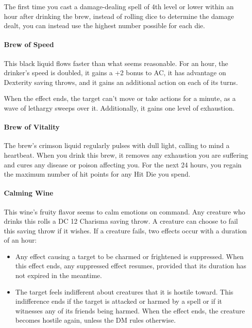         The first time you cast a damage-dealing spell of 4th level or lower within an hour after drinking the brew, instead of rolling dice to determine the damage dealt, you can instead use the highest number possible for each die.
    \paragraph{Brew of Speed} %
        This black liquid flows faster than what seems reasonable.
        For an hour, the drinker's speed is doubled, it gains a +2 bonus to AC, it has advantage on Dexterity saving throws, and it gains an additional action on each of its turns.

        When the effect ends, the target can't move or take actions for a minute, as a wave of lethargy sweeps over it.
        Additionally, it gains one level of exhaustion.
    \paragraph{Brew of Vitality} %
        The brew's crimson liquid regularly pulses with dull light, calling to mind a heartbeat.
        When you drink this brew, it removes any exhaustion you are suffering and cures any disease or poison affecting you.
        For the next 24 hours, you regain the maximum number of hit points for any Hit Die you spend.
    \paragraph{Calming Wine} %
        This wine's fruity flavor seems to calm emotions on command.
        Any creature who drinks this rolls a DC 12 Charisma saving throw.
        A creature can choose to fail this saving throw if it wishes.
        If a creature fails, two effects occur with a duration of an hour:
        \begin{itemize}
            \item Any effect causing a target to be charmed or frightened is suppressed.
            When this effect ends, any suppressed effect resumes, provided that its duration has not expired in the meantime.
            \item The target feels indifferent about creatures that it is hostile toward.
            This indifference ends if the target is attacked or harmed by a spell or if it witnesses any of its friends being harmed.
            When the effect ends, the creature becomes hostile again, unless the DM rules otherwise.
        \end{itemize}

